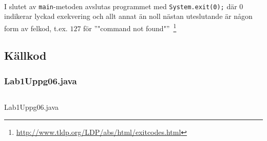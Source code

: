 \\
\par I slutet av \texttt{main}-metoden avslutas programmet med
\texttt{System.exit(0);} där $0$ indikerar lyckad exekvering och allt annat än
noll nästan uteslutande är någon form av felkod, t.ex. $127$ för ''"command not found"''\ 
\footnote{\url{http://www.tldp.org/LDP/abs/html/exitcodes.html}}


\subsection{Källkod}\label{uppgift-6_src}
\subsubsection*{Lab1Uppg06.java}
    \inputminted[linenos]{java}{src/Lab1Uppg06.java}
    \caption{Lab1Uppg06.java}
    \label{Uppg6src}
